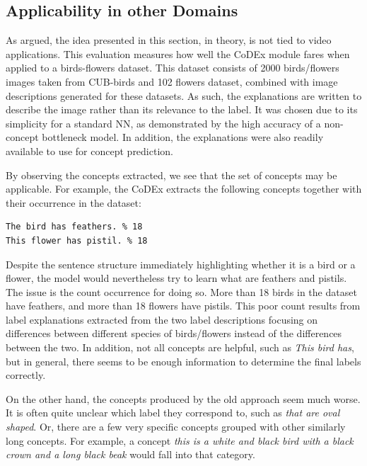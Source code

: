 \subsection{Applicability in other Domains}
\label{applicability-in-other-domains}


As argued, the idea presented in this section, in theory, is not tied to video applications.
This evaluation measures how well the CoDEx module fares when applied to a birds-flowers dataset.
This dataset consists of 2000 birds/flowers images taken from CUB-birds \cite{RefWorks:RefID:87-wah2011caltech-ucsd} and 102 flowers \cite{RefWorks:RefID:70-nilsback2008automated} dataset, combined with image descriptions generated for these datasets.
As such, the explanations are written to describe the image rather than its relevance to the label.
It was chosen due to its simplicity for a standard NN, as demonstrated by the high accuracy of a non-concept bottleneck model. 
In addition, the explanations were also readily available to use for concept prediction.

By observing the concepts extracted, we see that the set of concepts may be applicable. 
For example, the CoDEx extracts the following concepts together with their occurrence in the dataset:
\begin{verbatim}
The bird has feathers. % 18
This flower has pistil. % 18
\end{verbatim}
Despite the sentence structure immediately highlighting whether it is a bird or a flower, the model would nevertheless try to learn what are feathers and pistils.
The issue is the count occurrence for doing so.
More than 18 birds in the dataset have feathers, and more than 18 flowers have pistils.
This poor count results from label explanations extracted from the two label descriptions focusing on differences between different species of birds/flowers instead of the differences between the two.
In addition, not all concepts are helpful, such as \emph{This bird has}, but in general, there seems to be enough information to determine the final labels correctly.

On the other hand, the concepts produced by the old approach seem much worse. 
It is often quite unclear which label they correspond to, such as \emph{that are oval shaped}.
Or, there are a few very specific concepts grouped with other similarly long concepts. 
For example, a concept \emph{this is a white and black bird with a black crown and a long black beak} would fall into that category.

